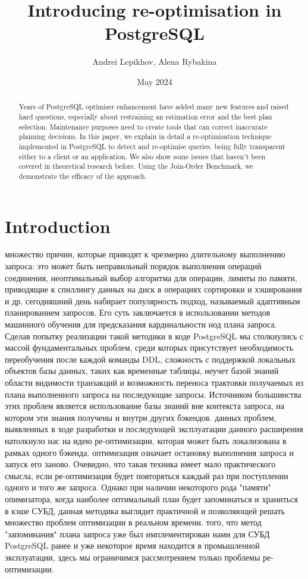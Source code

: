 \documentclass{article}
\begin{document}
\title{Introducing re-optimisation in PostgreSQL}
\author{Andrei Lepikhov, Alena Rybakina}
\date{May 2024}

\maketitle

\begin{abstract}
Years of PostgreSQL optimiser enhancement have added many new features and raised hard questions, especially about restraining an estimation error and the best plan selection. Maintenance purposes need to create tools that can correct inaccurate planning decisions. In this paper, we explain in detail a re-optimisation technique implemented in PostgreSQL to detect and re-optimise queries, being fully transparent either to a client or an application. We also show some issues that haven't been covered in theoretical research before. Using the Join-Order Benchmark, we demonstrate the efficacy of the approach.
\end{abstract}


\section{Introduction}
 множество причин, которые приводят к чрезмерно длительному выполнению запроса: это может быть неправильный порядок выполнения операций соединения, неоптимальный выбор алгоритма для операции, лимиты по памяти, приводящие к спиллингу данных на диск в операциях сортировки и хэширования и др.
 сегодняшний день набирает популярность подход, называемый адаптивным планированием запросов. Его суть заключается в использовании методов машинного обучения для предсказания кардинальности нод плана запроса. Сделав попытку реализации такой методики в коде PostgreSQL мы столкнулись с массой фундаментальных проблем, среди которых присутствует необходимость переобучения после каждой команды DDL, сложность с поддержкой локальных объектов базы данных, таких как временные таблицы, неучет базой знаний области видимости транзакций и возможность переноса трактовки получаемых из плана выполненного запроса на последующие запросы. Источником большинства этих проблем является использование базы знаний вне контекста запроса, на котором эти знания получены и внутри других бэкендов.
 данных проблем, выявленных в ходе разработки и последующей эксплуатации данного расширения натолкнуло нас на идею ре-оптимизации, которая может быть локализована в рамках одного бэкенда.
 оптимизация означает остановку выполнения запроса и запуск его заново. Очевидно, что такая техника имеет мало практического смысла, если ре-оптимизация будет повторяться каждый раз при поступлении одного и того же запроса. Однако при наличии некоторого рода "памяти" опимизатора, когда наиболее оптимальный план будет запоминаться и храниться в кэше СУБД, данная методика выглядит практичной и позволяющей решать множество проблем оптимизации в реальном времени.
 того, что метод "запоминания" плана запроса уже был имплементирован нами для СУБД PostgreSQL ранее \cite{srplan} и уже некоторое время находится в промышленной эксплуатации, здесь мы ограничимся рассмотрением только проблемы ре-оптимизации.
\cite{Perron2019HowIL}
\end{document}
